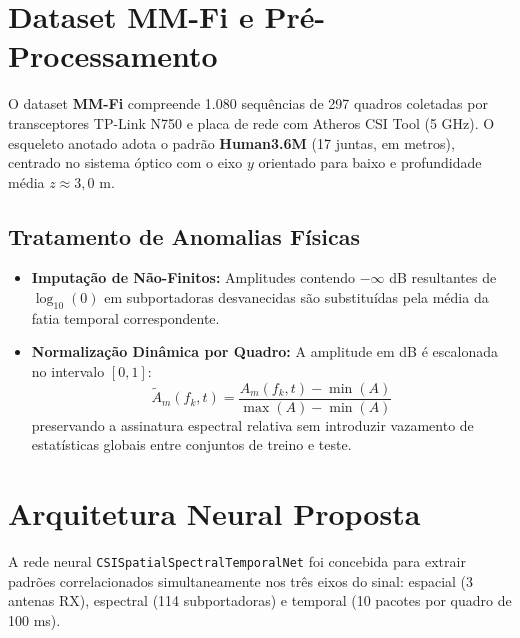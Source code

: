 \documentclass[10pt,a4paper,twocolumn]{article}
\begin{document}
\section{Dataset MM-Fi e Pré-Processamento}

O dataset \textbf{MM-Fi} compreende 1.080 sequências de 297 quadros coletadas por transceptores TP-Link N750 e placa de rede com Atheros CSI Tool (5 GHz). O esqueleto anotado adota o padrão \textbf{Human3.6M} (17 juntas, em metros), centrado no sistema óptico com o eixo $y$ orientado para baixo e profundidade média $z \approx 3{,}0\text{ m}$.

\subsection{Tratamento de Anomalias Físicas}
\begin{itemize}
    \item \textbf{Imputação de Não-Finitos:} Amplitudes contendo $-\infty$ dB resultantes de $\log_{10}(0)$ em subportadoras desvanecidas são substituídas pela média da fatia temporal correspondente.
    \item \textbf{Normalização Dinâmica por Quadro:} A amplitude em dB é escalonada no intervalo $[0, 1]$:
    \begin{equation}
    \tilde{A}_m(f_k, t) = \frac{A_m(f_k, t) - \min(A)}{\max(A) - \min(A)}
    \end{equation}
    preservando a assinatura espectral relativa sem introduzir vazamento de estatísticas globais entre conjuntos de treino e teste.
\end{itemize}

\section{Arquitetura Neural Proposta}

A rede neural \texttt{CSISpatialSpectralTemporalNet} foi concebida para extrair padrões correlacionados simultaneamente nos três eixos do sinal: espacial (3 antenas RX), espectral (114 subportadoras) e temporal (10 pacotes por quadro de 100 ms).
\end{document}
